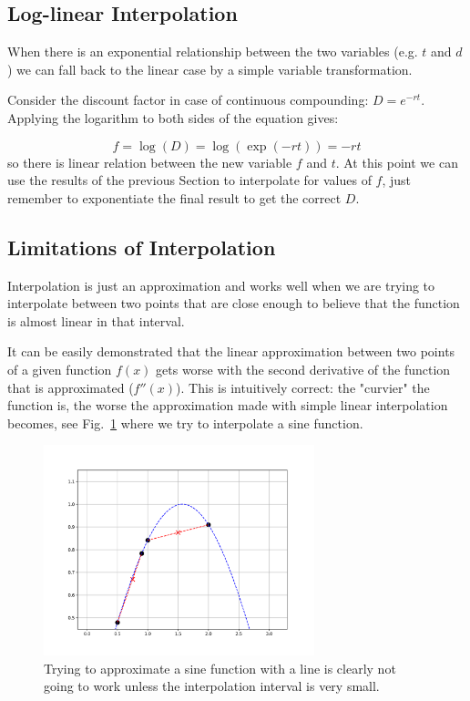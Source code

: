 \subsection{Log-linear Interpolation}
\label{log-linear-interpolation}

When there is an exponential relationship between the two variables (e.g. $t$ and $d$) we can fall back to the linear case by a simple variable transformation. 

Consider the discount factor in case of continuous compounding: $D=e^{-rt}$. Applying the logarithm to both sides of the equation gives:

\begin{equation}
f = \log(D) = \log(\exp(-rt)) = -rt
\end{equation}
so there is linear relation between the new variable $f$ and $t$. At this point we can use the results of the previous Section to interpolate for values of $f$, just remember to exponentiate the final result to get the correct $D$.

\subsection{Limitations of Interpolation}
Interpolation is just an approximation and works well when we are trying to interpolate between two points that are close enough to believe that the function is almost linear in that interval.

It can be easily demonstrated that the linear approximation between two points of a given function $f(x)$ gets worse with the second derivative of the function that is approximated ($f''(x)$). This is intuitively correct: the "curvier" the function is, the worse the approximation made with simple linear interpolation becomes, see Fig.~\ref{fig:sine_interp} where we try to interpolate a sine function.

\begin{figure}
  \centering
  \includegraphics[width=0.7\textwidth]{figures/wrong_interp.png}
  \caption{Trying to approximate a sine function with a line is clearly not going to work unless the interpolation interval is very small.}
  \label{fig:sine_interp}
\end{figure}

